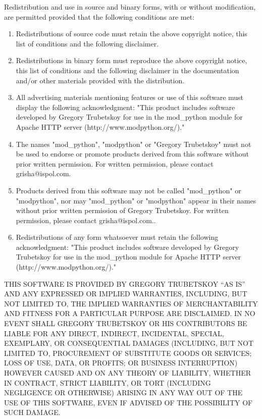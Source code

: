 \centerline{}

Redistribution and use in source and binary forms, with or without
modification, are permitted provided that the following conditions
are met:

\begin{enumerate}

\item
Redistributions of source code must retain the above copyright
notice, this list of conditions and the following disclaimer. 

\item
Redistributions in binary form must reproduce the above copyright
notice, this list of conditions and the following disclaimer in the
documentation and/or other materials provided with the distribution.

\item
All advertising materials mentioning features or use of this software
must display the following acknowledgment: "This product includes
software developed by Gregory Trubetskoy for use in the mod_python
module for Apache HTTP server (http://www.modpython.org/)."

\item
The names "mod_python", "modpython" or "Gregory Trubetskoy" must not 
be used to endorse or promote products derived from this software 
without prior written permission. For written permission, please 
contact grisha@ispol.com.

\item
Products derived from this software may not be called "mod_python"
or "modpython", nor may "mod_python" or "modpython" appear in their 
names without prior written permission of Gregory Trubetskoy. For 
written permission, please contact grisha@ispol.com..

\item
Redistributions of any form whatsoever must retain the following
acknowledgment:
"This product includes software developed by Gregory Trubetskoy
for use in the mod_python module for Apache HTTP server 
(http://www.modpython.org/)."

\end{enumerate}

THIS SOFTWARE IS PROVIDED BY GREGORY TRUBETSKOY ``AS IS'' AND ANY
EXPRESSED OR IMPLIED WARRANTIES, INCLUDING, BUT NOT LIMITED TO, THE
IMPLIED WARRANTIES OF MERCHANTABILITY AND FITNESS FOR A PARTICULAR
PURPOSE ARE DISCLAIMED.  IN NO EVENT SHALL GREGORY TRUBETSKOY OR
HIS CONTRIBUTORS BE LIABLE FOR ANY DIRECT, INDIRECT, INCIDENTAL,
SPECIAL, EXEMPLARY, OR CONSEQUENTIAL DAMAGES (INCLUDING, BUT
NOT LIMITED TO, PROCUREMENT OF SUBSTITUTE GOODS OR SERVICES;
LOSS OF USE, DATA, OR PROFITS; OR BUSINESS INTERRUPTION)
HOWEVER CAUSED AND ON ANY THEORY OF LIABILITY, WHETHER IN CONTRACT,
STRICT LIABILITY, OR TORT (INCLUDING NEGLIGENCE OR OTHERWISE)
ARISING IN ANY WAY OUT OF THE USE OF THIS SOFTWARE, EVEN IF ADVISED
OF THE POSSIBILITY OF SUCH DAMAGE.

